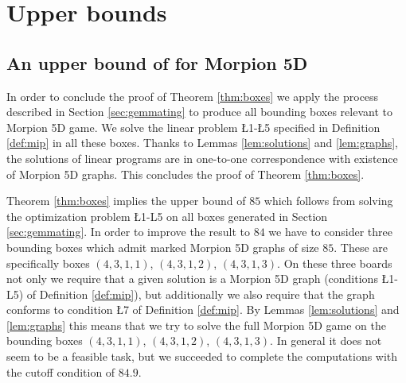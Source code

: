 \section{Upper bounds}
\label{sec:upper}

  
\subsection{An upper bound of \therecord for Morpion 5D}
\label{subsec:84}

In order to conclude the proof of Theorem \ref{thm:boxes} we apply the process described in Section \ref{sec:gemmating} to produce all bounding boxes relevant 
to Morpion 5D game. We solve the linear problem \L{1}-\L{5} specified in Definition \ref{def:mip} in all these boxes. Thanks to 
Lemmas \ref{lem:solutions} and \ref{lem:graphs}, the solutions of linear programs are in one-to-one correspondence with existence of
Morpion 5D graphs. This concludes the proof of Theorem \ref{thm:boxes}.


Theorem \ref{thm:boxes} implies the upper bound of $85$ which follows from solving the optimization
problem \L{1}-L{5} on all boxes generated in Section \ref{sec:gemmating}. 
In order to improve the result to $84$ we have to consider three bounding boxes which admit marked Morpion 5D graphs of size $85$. These
are specifically boxes $(4,3,1,1)$, $(4,3,1,2)$, $(4,3,1,3)$.
On these three boards %
not only we require that a given solution is a 
Morpion 5D graph (conditions \L{1}-L{5}) of Definition \ref{def:mip}), but additionally we also require that the graph conforms to condition \L{7} of Definition \ref{def:mip}. 
By Lemmas \ref{lem:solutions} and \ref{lem:graphs} this means that we try to solve the full Morpion 5D game on the bounding boxes  $(4,3,1,1)$, $(4,3,1,2)$, $(4,3,1,3)$.
In general it does not seem to be a feasible task, but we succeeded to complete the computations with the cutoff condition of $84.9$.

